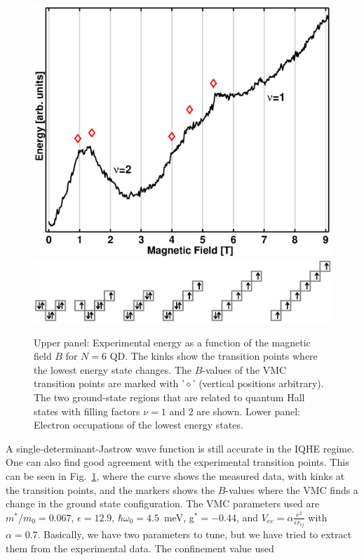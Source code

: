 \documentclass{article}
\begin{document}
%
\begin{figure}[hbt] 
\begin{center}
 \includegraphics[width=0.7\columnwidth]{Tjerk}\\
 \includegraphics[width=0.9\columnwidth]{Occ}
\caption{{Upper panel:} Experimental energy as a function of the
  magnetic field $B$ for $N=6$ QD. The kinks show the transition
  points where the lowest energy state changes.  The $B$-values of the
  VMC transition points are marked with '$\diamond$' (vertical
  positions arbitrary). The two ground-state regions that are related
  to quantum Hall states with filling factors $\nu=1$ and 2 are
  shown. {Lower panel:} Electron occupations of the lowest energy
  states.}
\label{Tjerk}
\end{center}
\end{figure}
%
A single-determinant-Jastrow wave function is still accurate in the
IQHE regime\cite{weakPRB}. One can also find good agreement with the
experimental transition points\cite{weakPRB}. This can be seen in
Fig.~\ref{Tjerk}, where the curve shows the measured data, with kinks
at the transition points, and the markers shows the $B$-values where
the VMC finds a change in the ground state configuration.  The VMC
parameters used are $m^*/m_0=0.067$, $\epsilon=12.9$,
$\hbar\omega_0=4.5$~meV, g$^*=-$0.44, and
$V_{ee}=\alpha\frac{e^{2}}{\epsilon r_{ij} }$ with $\alpha=0.7$.
Basically, we have two parameters to tune, but we have tried to
extract them from the experimental data.  The confinement value used
\end{document}
